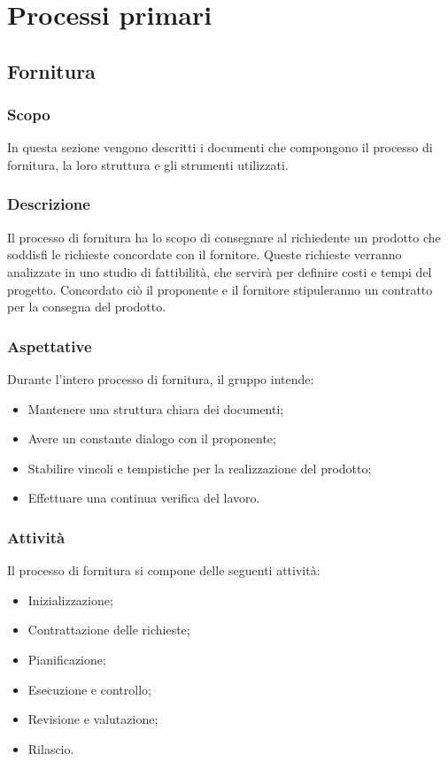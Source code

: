 \chapter{Processi primari}

\section{Fornitura}
\subsection{Scopo}
In questa sezione vengono descritti i documenti che compongono il processo di fornitura, la loro struttura e gli strumenti utilizzati.

\subsection{Descrizione}
Il processo di fornitura ha lo scopo di consegnare al richiedente un prodotto che soddisfi le richieste concordate con il fornitore.
Queste richieste verranno analizzate in uno studio di fattibilità, che servirà per definire costi e tempi del progetto. Concordato ciò il proponente e il fornitore stipuleranno un contratto per la consegna del prodotto.

\subsection{Aspettative}
Durante l’intero processo di fornitura, il gruppo intende:
\begin{itemize}
    \item Mantenere una struttura chiara dei documenti;
    \item Avere un constante dialogo con il proponente;
    \item Stabilire vincoli e tempistiche per la realizzazione del prodotto;
    \item Effettuare una continua verifica del lavoro.
\end{itemize}

\subsection{Attività}
Il processo di fornitura si compone delle seguenti attività:
\begin{itemize}
    \item Inizializzazione;
    \item Contrattazione delle richieste;
    \item Pianificazione;
    \item Esecuzione e controllo;
    \item Revisione e valutazione;
    \item Rilascio.
\end{itemize}

